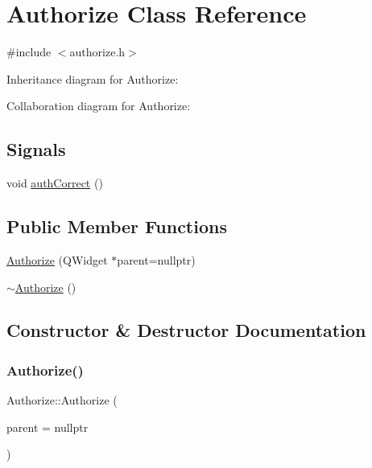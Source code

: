 \hypertarget{class_authorize}{}\section{Authorize Class Reference}
\label{class_authorize}


{\ttfamily \#include $<$authorize.\+h$>$}



Inheritance diagram for Authorize\+:


Collaboration diagram for Authorize\+:
\subsection*{Signals}
\begin{DoxyCompactItemize}
\item 
void \mbox{\hyperlink{class_authorize_a27ba7d2178c33c1fcf722cb7c054d210}{auth\+Correct}} ()
\end{DoxyCompactItemize}
\subsection*{Public Member Functions}
\begin{DoxyCompactItemize}
\item 
\mbox{\hyperlink{class_authorize_a5de580efdb6e7bd80fc436c97e495b13}{Authorize}} (Q\+Widget $\ast$parent=nullptr)
\item 
\mbox{\hyperlink{class_authorize_a825194daace59ada42f80210f4a77eda}{$\sim$\+Authorize}} ()
\end{DoxyCompactItemize}


\subsection{Constructor \& Destructor Documentation}
\mbox{\label{class_authorize_a5de580efdb6e7bd80fc436c97e495b13}} 
\subsubsection{\texorpdfstring{Authorize()}{Authorize()}}
{\footnotesize\ttfamily Authorize\+::\+Authorize (\begin{DoxyParamCaption}\item[{Q\+Widget $\ast$}]{parent = {\ttfamily nullptr} }\end{DoxyParamCaption})\hspace{0.3cm}{\ttfamily [explicit]}}

